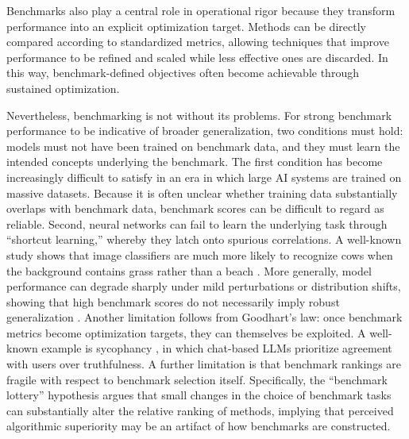 \documentclass{article}
\begin{document}
Benchmarks also play a central role in operational rigor because they transform performance into an explicit optimization target.
Methods can be directly compared according to standardized metrics, allowing techniques that improve performance to be refined and scaled while less effective ones are discarded.
In this way, benchmark-defined objectives often become achievable through sustained optimization.

Nevertheless, benchmarking is not without its problems.
For strong benchmark performance to be indicative of broader generalization, two conditions must hold: models must not have been trained on benchmark data, and they must learn the intended concepts underlying the benchmark.
The first condition has become increasingly difficult to satisfy in an era in which large AI systems are trained on massive datasets.
Because it is often unclear whether training data substantially overlaps with benchmark data, benchmark scores can be difficult to regard as reliable.
Second, neural networks can fail to learn the underlying task through ``shortcut learning,'' whereby they latch onto spurious correlations.
A well-known study shows that image classifiers are much more likely to recognize cows when the background contains grass rather than a beach \cite{Beery2018RecognitionTerraIncognita, Geirhos2020ShortcutLearning}.
More generally, model performance can degrade sharply under mild perturbations or distribution shifts, showing that high benchmark scores do not necessarily imply robust generalization \cite{hendrycks2018benchmarking, mirzadeh2025gsmsymbolic}.
Another limitation follows from Goodhart's law: once benchmark metrics become optimization targets, they can themselves be exploited.
A well-known example is sycophancy \cite{perez-etal-2023-discovering}, in which chat-based LLMs prioritize agreement with users over truthfulness.
A further limitation is that benchmark rankings are fragile with respect to benchmark selection itself.
Specifically, the ``benchmark lottery'' hypothesis \cite{dehghani2021benchmarklottery} argues that small changes in the choice of benchmark tasks can substantially alter the relative ranking of methods, implying that perceived algorithmic superiority may be an artifact of how benchmarks are constructed.
\end{document}
